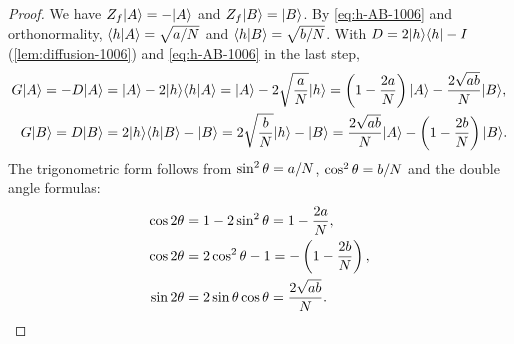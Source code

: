 \begin{proof}
    We have $Z_f\lvert A \rangle = -\lvert A \rangle$ and $Z_f\lvert B \rangle = \lvert B \rangle$. By \cref{eq:h-AB-1006} and
    orthonormality, $\langle h \vert A \rangle = \sqrt{a/N}$ and $\langle h \vert B \rangle = \sqrt{b/N}$. With
    $D = 2\lvert h \rangle\langle h \rvert - I$ (\cref{lem:diffusion-1006}) and \cref{eq:h-AB-1006} in the last step,
    \begin{align*}
        G\lvert A \rangle = -D\lvert A \rangle & = \lvert A \rangle - 2\lvert h \rangle\langle h \vert A \rangle = \lvert A \rangle - 2\sqrt{\frac{a}{N}} \lvert h \rangle
        = \left(1 - \frac{2a}{N}\right)\lvert A \rangle - \frac{2\sqrt{ab}}{N}\lvert B \rangle, \\
        G\lvert B \rangle = D\lvert B \rangle  & = 2\lvert h \rangle\langle h \vert B \rangle - \lvert B \rangle = 2\sqrt{\frac{b}{N}} \lvert h \rangle - \lvert B \rangle
        = \frac{2\sqrt{ab}}{N}\lvert A \rangle - \left(1 - \frac{2b}{N}\right)\lvert B \rangle.
    \end{align*}
    The trigonometric form follows from $\sin^2\theta = a/N$, $\cos^2\theta = b/N$ and
    the double angle formulas:
    \begin{align*}
        \cos 2\theta & = 1 - 2\sin^2\theta = 1 - \frac{2a}{N},                 \\
        \cos 2\theta & = 2\cos^2\theta - 1 = -\left(1 - \frac{2b}{N}\right), \\
        \sin 2\theta & = 2\sin\theta\cos\theta = \frac{2\sqrt{ab}}{N}. \qedhere
    \end{align*}
\end{proof}

